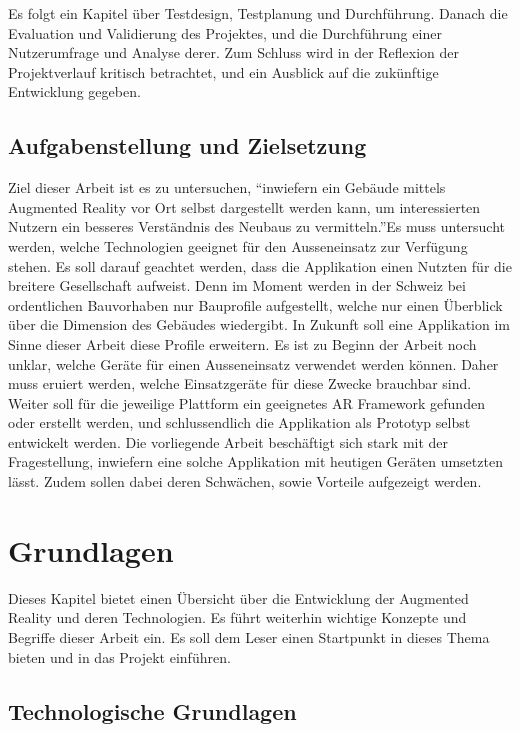 \documentclass[a4paper]{scrreprt}
\begin{document}
Es folgt ein Kapitel über Testdesign, Testplanung und Durchführung. Danach die Evaluation und Validierung des Projektes, und die Durchführung einer Nutzerumfrage und Analyse derer. Zum Schluss wird in der Reflexion der Projektverlauf kritisch betrachtet, und ein Ausblick auf die zukünftige Entwicklung gegeben.

\section{Aufgabenstellung und Zielsetzung}
Ziel dieser Arbeit ist es zu untersuchen, \textquotedblleft inwiefern ein Gebäude mittels Augmented Reality vor Ort selbst dargestellt werden kann, um interessierten Nutzern ein besseres Verständnis des Neubaus zu vermitteln.\textquotedblright Es muss untersucht werden, welche Technologien geeignet für den Ausseneinsatz zur Verfügung stehen. Es soll darauf geachtet werden, dass die Applikation einen Nutzten für die breitere Gesellschaft aufweist. Denn im Moment werden in der Schweiz bei ordentlichen Bauvorhaben nur Bauprofile aufgestellt, welche nur einen Überblick über die Dimension des Gebäudes wiedergibt. In Zukunft soll eine Applikation im Sinne dieser Arbeit diese Profile erweitern.
\bigbreak
Es ist zu Beginn der Arbeit noch unklar, welche Geräte für einen Ausseneinsatz verwendet werden können. Daher muss eruiert werden, welche Einsatzgeräte für diese Zwecke brauchbar sind. Weiter soll für die jeweilige Plattform ein geeignetes AR Framework gefunden oder erstellt werden, und schlussendlich die Applikation als Prototyp selbst entwickelt werden.
\bigbreak
Die vorliegende Arbeit beschäftigt sich stark mit der Fragestellung, inwiefern eine solche Applikation mit heutigen Geräten umsetzten lässt. Zudem sollen dabei deren Schwächen, sowie Vorteile aufgezeigt werden.

\chapter{Grundlagen}
\label{ch:StandDerForschung}

Dieses Kapitel bietet einen Übersicht über die Entwicklung der Augmented Reality und deren Technologien. Es führt weiterhin wichtige Konzepte und Begriffe dieser Arbeit ein. Es soll dem Leser einen Startpunkt in dieses Thema bieten und in das Projekt einführen.

\section{Technologische Grundlagen}
\end{document}
